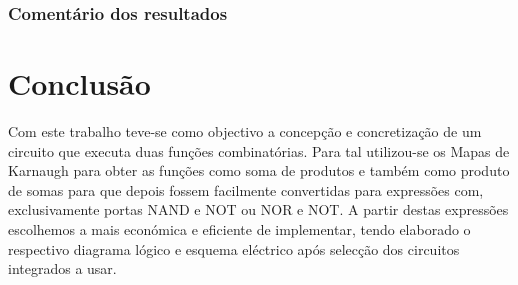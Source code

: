 \documentclass[a4paper,12pt]{article}
\begin{document}
\subsubsection{Comentário dos resultados}
\pagebreak
\section{Conclusão}
Com este trabalho teve-se como objectivo a concepção e concretização de um circuito que executa duas funções combinatórias. Para tal utilizou-se os Mapas de Karnaugh para obter as funções como soma de produtos e também como produto de somas para que depois fossem facilmente convertidas para expressões com, exclusivamente portas NAND e NOT ou NOR e NOT. A partir destas expressões escolhemos a mais económica e eficiente de implementar, tendo elaborado o respectivo diagrama lógico e esquema eléctrico após selecção dos circuitos integrados a usar.
\end{document}
